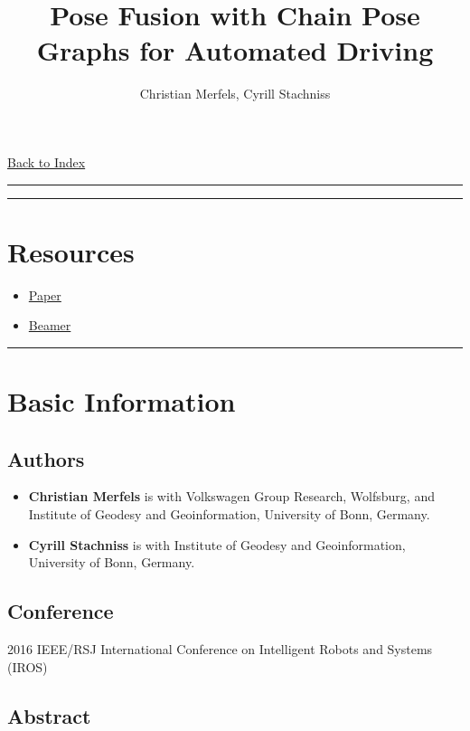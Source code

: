 \documentclass[letterpaper,10pt]{article}
\title{\textbf{Pose Fusion with Chain Pose Graphs for Automated Driving}}
\author{Christian Merfels, Cyrill Stachniss}
\begin{document}
	
\maketitle

\href{../index.html}{Back to Index}
\begin{center}\rule{\textwidth}{1pt}\end{center}

\tableofcontents

\begin{center}\rule{\textwidth}{1pt}\end{center}
\section{Resources}

\begin{itemize}
	\item \href{./paper.pdf}{Paper}
	\item \href{./beamer.pdf}{Beamer}
\end{itemize}

\begin{center}\rule{\textwidth}{1pt}\end{center}
\section{Basic Information}

\subsection{Authors}

\begin{itemize}
	\item \textbf{Christian Merfels} is with Volkswagen Group Research, Wolfsburg, and Institute of Geodesy and Geoinformation, University of Bonn, Germany.
	\item \textbf{Cyrill Stachniss} is with Institute of Geodesy and Geoinformation, University of Bonn, Germany.
\end{itemize}

\subsection{Conference}

2016 IEEE/RSJ International Conference on Intelligent Robots and Systems (IROS)

\subsection{Abstract}
\end{document}
